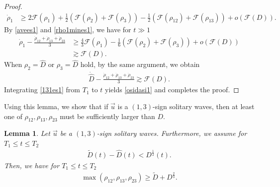 \documentclass[reqno]{amsart}
\theoremstyle{plain}
\newtheorem{lemma}[theorem]{Lemma}
\theoremstyle{definition}
\numberwithin{equation}{section}
\newcommand{\1}{\mathbbm{1}}
\begin{document}
\begin{proof}
\begin{align}\label{rho1mines1}
\dot{\rho}_1&\geq 2\mathcal{F}(\rho_1)+\frac{1}{2}\left(\mathcal{F}(\rho_2)+\mathcal{F}(\rho_3)\right)-\frac{1}{2}\left(\mathcal{F}(\rho_{12})+\mathcal{F}(\rho_{13})\right)+o\left(\mathcal{F}(D)\right).
\end{align}
By \eqref{avees1} and \eqref{rho1mines1}, we have for $t\gg 1$
\begin{align*}
\dot{\rho}_1-\frac{\dot{\rho}_{12}+\dot{\rho}_{13}+\dot{\rho}_{23}}{3}&\geq \frac{4}{3}\mathcal{F}(\rho_1)-\frac{1}{6}\left(\mathcal{F}(\rho_2)+\mathcal{F}(\rho_3)\right)+o\left(\mathcal{F}(D)\right)
\\
&\gtrsim \mathcal{F}(D).
\end{align*}
When $\rho_2=\hat{D}$ or $\rho_3=\hat{D}$ hold, by the same argument, we obtain
\begin{align}\label{131es1}
\dot{\hat{D}}-\frac{\dot{\rho}_{12}+\dot{\rho}_{13}+\dot{\rho}_{23}}{3}\gtrsim \mathcal{F}(D).
\end{align}
Integrating \eqref{131es1} from $T_1$ to $t$ yields \eqref{osidasi1} and completes the proof.
\end{proof}
Using this lemma, we show that if $\vec{u}$ is a $(1,3)$-sign solitary waves, then at least one of $\rho_{12}, \rho_{13}, \rho_{23}$ must be sufficiently larger than $D$.
\begin{lemma}\label{hitotuhanagai}
Let $\vec{u}$ be a $(1,3)$-sign solitary waves. Furthermore, we assume for $T_1\leq t\leq T_2$
\begin{align}\label{estimate0124}
\tilde{D}(t)-\hat{D}(t)<D^{\frac{1}{2}}(t).
\end{align}
Then, we have for $T_1\leq t\leq T_2$
\begin{align*}
\max{(\rho_{12},\rho_{13},\rho_{23})}\geq \tilde{D}+D^{\frac{2}{3}}.
\end{align*}
\end{lemma}
\end{document}
